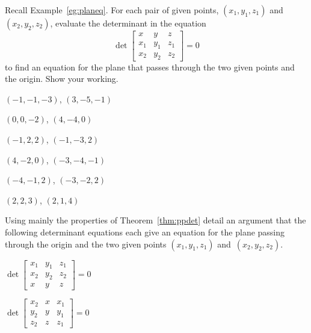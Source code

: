 \begin{exercise} \label{ex:} 
Recall Example~\ref{eg:planeq}.
For each pair of given points, \((x_1,y_1,z_1)\) and~\((x_2,y_2,z_2)\), evaluate the determinant in the equation
\begin{equation*}
\det\begin{bmatrix} x&y&z\\x_1&y_1&z_1\\x_2&y_2&z_2 \end{bmatrix}=0
\end{equation*}
to find an equation for the plane that passes through the two given points and the origin.
Show your working.
\begin{parts}
\item \((-1,-1,-3)\), \((3,-5,-1)\)

\item \((0,0,-2)\), \((4,-4,0)\)

\item \((-1,2,2)\), \((-1,-3,2)\)

\item \((4,-2,0)\), \((-3,-4,-1)\)

\item \((-4,-1,2)\), \((-3,-2,2)\)

\item \((2,2,3)\), \((2,1,4)\)

\end{parts}
\end{exercise}




\begin{exercise} \label{ex:} 
Using mainly the properties of Theorem~\ref{thm:ppdet} detail an argument that the following determinant equations each give an equation for the plane passing through the origin and the two given points \((x_1,y_1,z_1)\) and~\((x_2,y_2,z_2)\).
\begin{parts}
\item \(\det\begin{bmatrix} x_1&y_1&z_1
\\x_2&y_2&z_2
\\x&y&z \end{bmatrix}=0\)

\item \(\det\begin{bmatrix} x_2&x&x_1
\\y_2&y&y_1
\\z_2&z&z_1 \end{bmatrix}=0\)

\end{parts}
\end{exercise}








